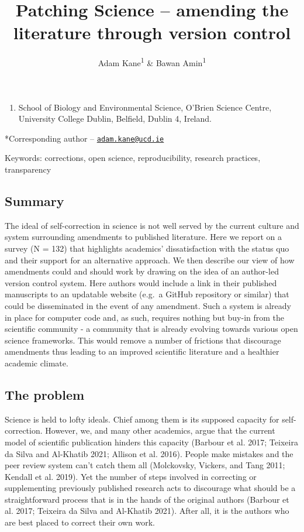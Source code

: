 \documentclass[
]{article}
\title{Patching Science -- amending the literature through version
control}
\author{Adam Kane\textsuperscript{1} \& Bawan Amin\textsuperscript{1}}
\date{}
\providecommand{\tightlist}{%
  \setlength{\itemsep}{0pt}\setlength{\parskip}{0pt}}
\begin{document}
\maketitle

\begin{enumerate}
\def\labelenumi{\arabic{enumi}.}
\tightlist
\item
  School of Biology and Environmental Science, O'Brien Science Centre,
  University College Dublin, Belfield, Dublin 4, Ireland.
\end{enumerate}

*Corresponding author --
\href{mailto:adam.kane@ucd.ie}{\nolinkurl{adam.kane@ucd.ie}}

Keywords: corrections, open science, reproducibility, research
practices, transparency

\hypertarget{summary}{%
\subsection{Summary}\label{summary}}

The ideal of self-correction in science is not well served by the
current culture and system surrounding amendments to published
literature. Here we report on a survey (N = 132) that highlights
academics' dissatisfaction with the status quo and their support for an
alternative approach. We then describe our view of how amendments could
and should work by drawing on the idea of an author-led version control
system. Here authors would include a link in their published manuscripts
to an updatable website (e.g.~a GitHub repository or similar) that could
be disseminated in the event of any amendment. Such a system is already
in place for computer code and, as such, requires nothing but buy-in
from the scientific community - a community that is already evolving
towards various open science frameworks. This would remove a number of
frictions that discourage amendments thus leading to an improved
scientific literature and a healthier academic climate.

\hypertarget{the-problem}{%
\subsection{The problem}\label{the-problem}}

Science is held to lofty ideals. Chief among them is its supposed
capacity for self-correction. However, we, and many other academics,
argue that the current model of scientific publication hinders this
capacity (Barbour et al. 2017; Teixeira da Silva and Al-Khatib 2021;
Allison et al. 2016). People make mistakes and the peer review system
can't catch them all (Molckovsky, Vickers, and Tang 2011; Kendall et al.
2019). Yet the number of steps involved in correcting or supplementing
previously published research acts to discourage what should be a
straightforward process that is in the hands of the original authors
(Barbour et al. 2017; Teixeira da Silva and Al-Khatib 2021). After all,
it is the authors who are best placed to correct their own work.
\end{document}
